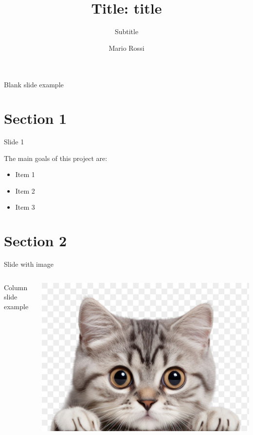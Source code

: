 \documentclass{beamer}
\title{Title: title}
\subtitle{Subtitle}
\author{Mario Rossi}
\begin{document}
\maketitle


\begin{frame}

Blank slide example

\vspace{\baselineskip}



\end{frame}



\section{Section 1}

\begin{frame}{Slide 1}

    The main goals of this project are:
    \begin{itemize}
        \item Item 1
        \item Item 2
        \item Item 3
    \end{itemize}
\end{frame}



\section{Section 2}


\begin{frame}[fragile]{Slide with image}
    \begin{columns}
    \begin{column}{0.6\textwidth}
        Column slide example
    \end{column}
    \begin{column}{0.4\textwidth}
            \includegraphics[width=\textwidth]{assets/cat.png}
    \end{column}
    \end{columns}
\end{frame}
\end{document}
